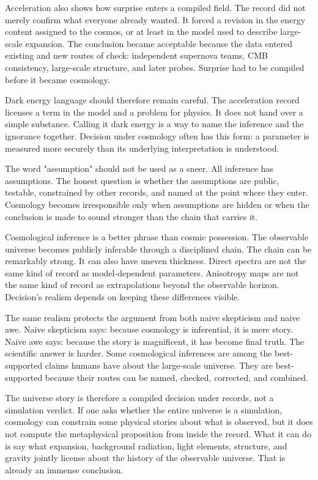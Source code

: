 Acceleration also shows how surprise enters a compiled field. The record did
not merely confirm what everyone already wanted. It forced a revision in the
energy content assigned to the cosmos, or at least in the model used to
describe large-scale expansion. The conclusion became acceptable because the
data entered existing and new routes of check: independent supernova teams,
CMB consistency, large-scale structure, and later probes. Surprise had to be
compiled before it became cosmology.

Dark energy language should therefore remain careful. The acceleration record
licenses a term in the model and a problem for physics. It does not hand over
a simple substance. Calling it dark energy is a way to name the inference and
the ignorance together. Decision under cosmology often has this form: a
parameter is measured more securely than its underlying interpretation is
understood.

The word "assumption" should not be used as a sneer. All inference has
assumptions. The honest question is whether the assumptions are public,
testable, constrained by other records, and named at the point where they
enter. Cosmology becomes irresponsible only when assumptions are hidden or
when the conclusion is made to sound stronger than the chain that carries it.

Cosmological inference is a better phrase than cosmic possession. The
observable universe becomes publicly inferable through a disciplined
chain. The chain can be remarkably strong. It can also have uneven thickness.
Direct spectra are not the same kind of record as model-dependent parameters.
Anisotropy maps are not the same kind of record as extrapolations beyond the
observable horizon. Decision's realism depends on keeping these differences
visible.

The same realism protects the argument from both naive skepticism and naive awe.
Naive skepticism says: because cosmology is inferential, it is mere story.
Naive awe says: because the story is magnificent, it has become final truth.
The scientific answer is harder. Some cosmological inferences are among the
best-supported claims humans have about the large-scale universe. They are
best-supported because their routes can be named, checked, corrected, and
combined.

The universe story is therefore a compiled decision under records, not a
simulation verdict. If one asks whether the entire universe is a simulation,
cosmology can constrain some physical stories about what is observed, but it
does not compute the metaphysical proposition from inside the record. What it
can do is say what expansion, background radiation, light elements, structure,
and gravity jointly license about the history of the observable universe.
That is already an immense conclusion.


